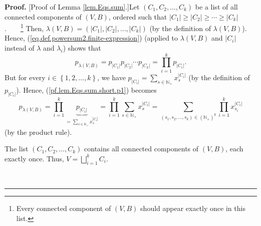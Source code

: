 \documentclass[numbers=enddot,12pt,final,onecolumn,notitlepage]{scrartcl}%
\theoremstyle{definition}
\newenvironment{proof}[1][Proof]{\noindent\textbf{#1.} }{\ \rule{0.5em}{0.5em}}
\newenvironment{vershort}{}{}
\let\sumnonlimits\sum
\let\prodnonlimits\prod
\renewcommand{\sum}{\sumnonlimits\limits}
\renewcommand{\prod}{\prodnonlimits\limits}
\begin{document}
\begin{vershort}
\begin{proof}
[Proof of Lemma \ref{lem.Eqs.sum}.]Let $\left(  C_{1},C_{2},\ldots
,C_{k}\right)  $ be a list of all connected components of $\left(  V,B\right)
$, ordered such that $\left\vert C_{1}\right\vert \geq\left\vert
C_{2}\right\vert \geq\cdots\geq\left\vert C_{k}\right\vert $%
.\ \ \ \ \footnote{Every connected component of $\left(  V,B\right)  $ should
appear exactly once in this list.} Then, $\lambda\left(  V,B\right)  =\left(
\left\vert C_{1}\right\vert ,\left\vert C_{2}\right\vert ,\ldots,\left\vert
C_{k}\right\vert \right)  $ (by the definition of $\lambda\left(  V,B\right)
$). Hence, (\ref{eq.def.powersum2.finite-expression}) (applied to
$\lambda\left(  V,B\right)  $ and $\left\vert C_{i}\right\vert $ instead of
$\lambda$ and $\lambda_{i}$) shows that{}%
\begin{equation}
p_{\lambda\left(  V,B\right)  }=p_{\left\vert C_{1}\right\vert }p_{\left\vert
C_{2}\right\vert }\cdots p_{\left\vert C_{k}\right\vert }=\prod_{i=1}%
^{k}p_{\left\vert C_{i}\right\vert }. \label{pf.lem.Eqs.sum.short.p1}%
\end{equation}
But for every $i\in\left\{  1,2,\ldots,k\right\}  $, we have $p_{\left\vert
C_{i}\right\vert }=\sum_{s\in\mathbb{N}_{+}}x_{s}^{\left\vert C_{i}\right\vert
}$ (by the definition of $p_{\left\vert C_{i}\right\vert }$). Hence,
(\ref{pf.lem.Eqs.sum.short.p1}) becomes%
\begin{equation}
p_{\lambda\left(  V,B\right)  }=\prod_{i=1}^{k}\underbrace{p_{\left\vert
C_{i}\right\vert }}_{=\sum_{s\in\mathbb{N}_{+}}x_{s}^{\left\vert
C_{i}\right\vert }}=\prod_{i=1}^{k}\sum_{s\in\mathbb{N}_{+}}x_{s}^{\left\vert
C_{i}\right\vert }=\sum_{\left(  s_{1},s_{2},\ldots,s_{k}\right)  \in\left(
\mathbb{N}_{+}\right)  ^{k}}\prod_{i=1}^{k}x_{s_{i}}^{\left\vert
C_{i}\right\vert } \label{pf.lem.Eqs.sum.short.p2}%
\end{equation}
(by the product rule).

The list $\left(  C_{1},C_{2},\ldots,C_{k}\right)  $ contains all connected
components of $\left(  V,B\right)  $, each exactly once. Thus, $V=\bigsqcup
_{i=1}^{k}C_{i}$.


\end{proof}
\end{vershort}
\end{document}
